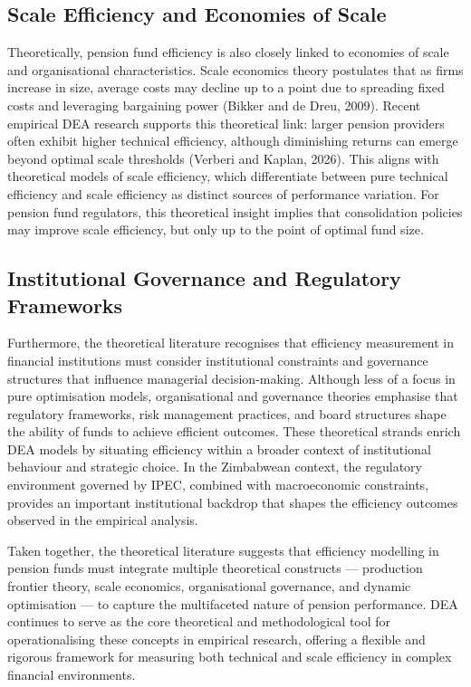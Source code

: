 \documentclass[12pt,a4paper]{article}
\begin{document}
\subsection{Scale Efficiency and Economies of Scale}

Theoretically, pension fund efficiency is also closely linked to economies of scale and organisational characteristics. Scale economics theory postulates that as firms increase in size, average costs may decline up to a point due to spreading fixed costs and leveraging bargaining power (Bikker and de Dreu, 2009). Recent empirical DEA research supports this theoretical link: larger pension providers often exhibit higher technical efficiency, although diminishing returns can emerge beyond optimal scale thresholds (Verberi and Kaplan, 2026). This aligns with theoretical models of scale efficiency, which differentiate between pure technical efficiency and scale efficiency as distinct sources of performance variation. For pension fund regulators, this theoretical insight implies that consolidation policies may improve scale efficiency, but only up to the point of optimal fund size.

\subsection{Institutional Governance and Regulatory Frameworks}

Furthermore, the theoretical literature recognises that efficiency measurement in financial institutions must consider institutional constraints and governance structures that influence managerial decision-making. Although less of a focus in pure optimisation models, organisational and governance theories emphasise that regulatory frameworks, risk management practices, and board structures shape the ability of funds to achieve efficient outcomes. These theoretical strands enrich DEA models by situating efficiency within a broader context of institutional behaviour and strategic choice. In the Zimbabwean context, the regulatory environment governed by IPEC, combined with macroeconomic constraints, provides an important institutional backdrop that shapes the efficiency outcomes observed in the empirical analysis.

Taken together, the theoretical literature suggests that efficiency modelling in pension funds must integrate multiple theoretical constructs --- production frontier theory, scale economics, organisational governance, and dynamic optimisation --- to capture the multifaceted nature of pension performance. DEA continues to serve as the core theoretical and methodological tool for operationalising these concepts in empirical research, offering a flexible and rigorous framework for measuring both technical and scale efficiency in complex financial environments.
\end{document}
